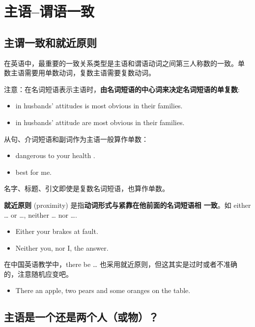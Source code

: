 \chapter{主语--谓语一致}

\section{主谓一致和就近原则}

在英语中，最重要的一致关系类型是主语和谓语动词之间第三人称数的一致。单
数主语需要用单数动词，复数主语需要复数动词。

注意：在名词短语表示主语时，\textbf{由名词短语的中心词来决定名词短语的单复数}:
\begin{itemize}
\item {} in husbands' attitudes is most obvious in their families.
\item {} in husbands' attitude are most obvious in their families.
\end{itemize}

从句、介词短语和副词作为主语一般算作单数：
\begin{itemize}
\item {}  dangerous to your health .

\item {}  best for me.
\end{itemize}

名字、标题、引文即使是复数名词短语，也算作单数。

\textbf{就近原则} (proximity) 是指\textbf{动词形式与紧靠在他前面的名词短语相
  一致}。如 either \ldots{} or \ldots{}, neither \ldots{} nor \ldots{}.
\begin{itemize}
\item Either your brakes   at fault.
\item Neither you, nor I,   the answer.
\end{itemize}

在中国英语教学中，there be \ldots{} 也采用就近原则，但这其实是过时或者不准确
的，注意随机应变吧。
\begin{itemize}
\item There  an apple, two pears and some oranges on the table.
\end{itemize}

\section{主语是一个还是两个人（或物）？}


